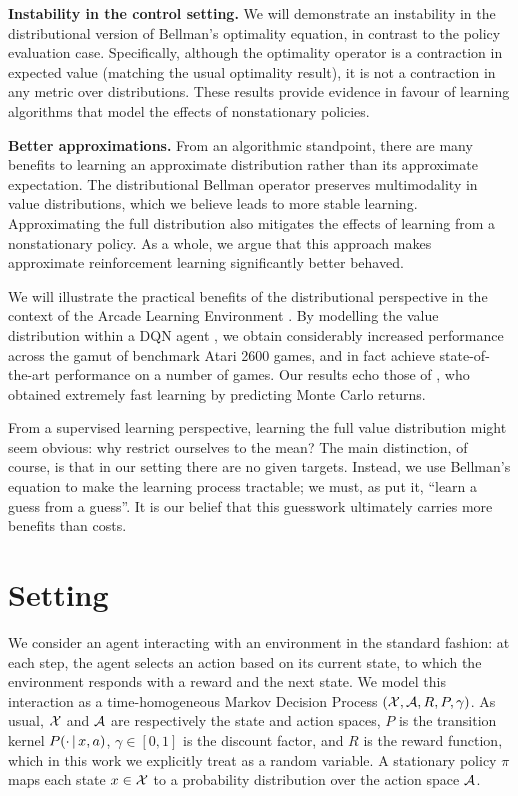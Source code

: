 \documentclass{article}
\begin{document}
\textbf{Instability in the control setting.} We will demonstrate an instability in the distributional version of Bellman's optimality equation, in contrast to the policy evaluation case. Specifically, although the optimality operator is a contraction in expected value (matching the usual optimality result), it is not a contraction in any metric over distributions.
These results provide evidence in favour of learning algorithms that model the effects of nonstationary policies.

\textbf{Better approximations.} From an algorithmic standpoint, there are many benefits to learning an approximate distribution rather than its approximate expectation.
The distributional Bellman operator preserves multimodality in value distributions, which we believe leads to more stable learning. Approximating the full distribution also mitigates the effects of learning from a nonstationary policy. As a whole, we argue that this approach makes approximate reinforcement learning significantly better behaved.%

%
%

%

We will illustrate the practical benefits of the distributional perspective in the context of the Arcade Learning Environment \citep{bellemare13arcade}. By modelling the value distribution within a DQN agent \citep{mnih15nature}, we obtain considerably increased performance across the gamut of benchmark Atari 2600 games, and in fact achieve state-of-the-art performance on a number of games. Our results echo those of \citet{veness15compress}, who obtained extremely fast learning by predicting Monte Carlo returns.
%

%
%


From a supervised learning perspective, learning the full value distribution might seem obvious: why restrict ourselves to the mean? The main distinction, of course, is that in our setting there are no given targets. Instead, we use Bellman's equation to make the learning process tractable; we must, as \citet{sutton98reinforcement} put it, ``learn a guess from a guess''. It is our belief that this guesswork ultimately carries more benefits than costs.

%

\section{Setting}

We consider an agent interacting with an environment in the standard fashion: at each step, the agent selects an action based on its current state, to which the environment responds with a reward and the next state. We model this interaction as a time-homogeneous Markov Decision Process $(\mathcal{X}, \mathcal{A}, R, P, \gamma)$. As usual, $\mathcal{X}$ and $\mathcal{A}$ are respectively the state and action spaces, $P$ is the transition kernel $P(\cdot \, | \, x, a)$, $\gamma \in [0, 1]$ is the discount factor, and
$R$ is the reward function, which in this work we explicitly treat as a random variable. A stationary policy $\pi$ maps each state $x \in \mathcal{X}$ to a probability distribution over the action space $\mathcal{A}$.
\end{document}
